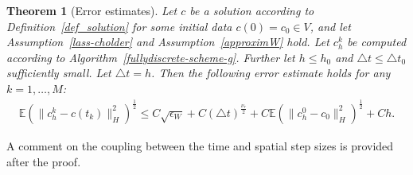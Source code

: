 \documentclass[a4paper,10pt]{article}
\newtheorem{teo}[cor]{Theorem}
\numberwithin{equation}{section}
\begin{document}
\begin{teo}[Error estimates] \label{err-est-g}
Let $c$ be a solution according to Definition~\ref{def_solution} for some initial data $c(0)=c_{0} \in V$, and let Assumption~\ref{lass-cholder} and Assumption~\ref{approximW} hold. Let $c_{h}^{k}$ be computed according to Algorithm~\ref{fullydiscrete-scheme-g}.
Further let $h \leq h_{0}$ and $\triangle t \leq \triangle t_{0}$ sufficiently small.
Let $\triangle t=h$. 
Then the following error estimate holds for any $k=1, \ldots, M$:
\begin{align*}
\mathbb{E}(\|c^{k}_{h}- c(t_{k})\|_{H}^{2})^{\frac{1}{2}}\leq C \sqrt{\epsilon_{W}} + C (\triangle t)^{\frac{\nu_{r}}{2}} + C \mathbb{E}( \|c^{0}_{h}- c_{0}\|_{H}^{2})^{\frac{1}{2}}+Ch.
\end{align*}
\end{teo}
A comment on the coupling between the time and spatial step sizes is provided after the proof.
\end{document}

